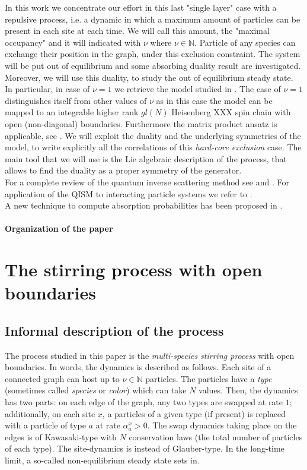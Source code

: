 \documentclass[10pt]{article}
\numberwithin{equation}{section}
\numberwithin{equation}{subsection}
\newcommand{\twoj}{\nu}
\begin{document}
In this work we concentrate our effort in this last "single layer" case with a repulsive process, i.e. a dynamic in which a maximum amount of particles can be present in each site at each time. We will call this amount, the "maximal occupancy" and it will indicated with $\twoj$ where $\twoj\in\mathbb{N}$. Particle of any species can exchange their position in the graph, under this exclusion constraint. The system will be put out of equilibrium and some absorbing duality result are investigated. Moreover, we will use this duality, to study the out of equilibrium steady state. In particular, in case of $\twoj=1$ we retrieve the model studied in \cite{vanicat2017exact}. 
{\color{red}
The case of $\twoj=1$ distinguishes itself from other values of $\twoj$ as in this case the model can be mapped to an integrable higher rank $gl(N)$ Heisenberg XXX spin chain with open (non-diagonal) boundaries. Furthermore the matrix product ansatz \cite{derrida1993exact}  is applicable, see \cite{Crampe:2014aoa,vanicat2017exact}.
}
We will exploit the duality and the underlying symmetries of the model, to write explicitly all the correlations of this \textit{hard-core exclusion} case. The main tool that we will use is the Lie algebraic description of the process, that allows to find the duality as a proper symmetry of the generator. \\
 For a complete review of the quantum inverse scattering method see \cite{Sklyanin:1988yz} and \cite{faddeev1996algebraic}. For application of the QISM to interacting particle systems we refer to \cite{frassek2020eigenstates,frassek2019non,frassek2022exact,vanicat2017exact}. \\
 A new technique to compute absorption probabilities has been proposed in \cite{floreani2023non}.
\paragraph{Organization of the paper}
%
%
%
%
\section{The stirring process with open boundaries}
\subsection{Informal description of the process}
The process studied in this paper is the {\em multi-species stirring process}
with open boundaries. 
In words, the dynamics is described as follows. Each site
of a connected graph can host up to $\nu\in \mathbb{N}$ particles.
The particles have a {\em type} (sometimes called {\em species} or {\em color})
which can take $N$ values.
Then, the dynamics has two parts: on each edge of the graph, 
any two types are swapped at rate $1$; additionally, on each site $x$, 
a particles of a given type (if present) is replaced with a
particle of type $a$ at rate $\alpha_a^x >0$.
The swap dynamics taking place on the edges is of Kawasaki-type 
with $N$ conservation laws
(the total number of particles of each type). 
The site-dynamics is instead of Glauber-type. 
In the long-time limit, a so-called non-equilibrium
steady state sets in.
\end{document}
